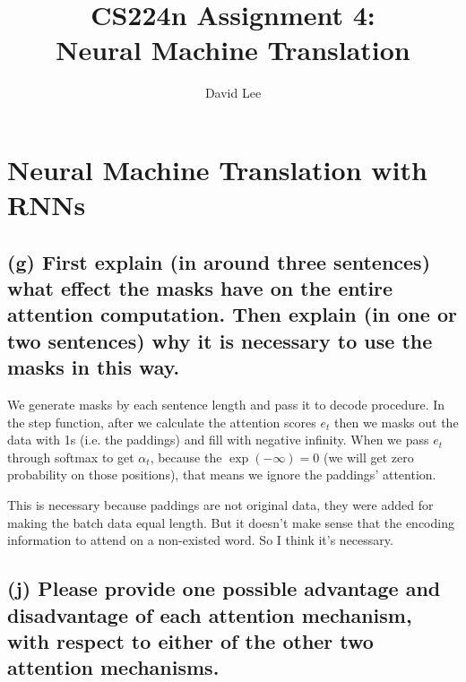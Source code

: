 \documentclass[12pt, letterpaper]{article}
\title{CS224n Assignment 4: \\ Neural Machine Translation}
\author{David Lee}
\begin{document}
\maketitle

\section{Neural Machine Translation with RNNs}
\subsection*{(g) First explain (in around three sentences) what effect the masks have on the entire attention computation. Then explain (in one or two sentences) why it is necessary to use the masks in this way.}

We generate masks by each sentence length and pass it to decode procedure. In the step function, after we calculate the attention scores $e_t$ then we masks out the data with 1s (i.e. the paddings) and fill with negative infinity. When we pass $e_t$ through softmax to get $\alpha_t$, because the $\exp(-\infty) = 0$ (we will get zero probability on those positions), that means we ignore the paddings' attention.

This is necessary because paddings are not original data, they were added for making the batch data equal length. But it doesn't make sense that the encoding information to attend on a non-existed word. So I think it's necessary.

\subsection*{(j) Please provide one possible advantage and disadvantage of each attention mechanism, with respect to either of the other two attention mechanisms.}
\end{document}
